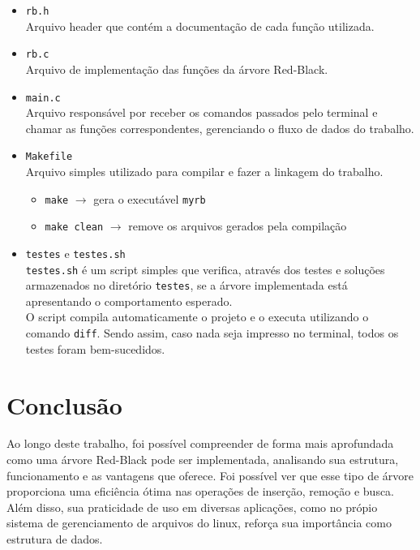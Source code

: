 \documentclass{article}  %
\begin{document}
    \begin{itemize}
        \item \texttt{rb.h} \\
        Arquivo header que contém a documentação de cada função utilizada.
        
        \item \texttt{rb.c} \\
        Arquivo de implementação das funções da árvore Red-Black.
        
        \item \texttt{main.c} \\
        Arquivo responsável por receber os comandos passados pelo terminal e chamar as funções correspondentes, gerenciando o fluxo de dados do trabalho.
        
        \item \texttt{Makefile} \\
        Arquivo simples utilizado para compilar e fazer a linkagem do trabalho.
        \begin{itemize}
            \item \texttt{make} \( \rightarrow \) gera o executável \texttt{myrb}
            \item \texttt{make clean} \( \rightarrow \) remove os arquivos gerados pela compilação
        \end{itemize}
        
        \item \texttt{testes} e \texttt{testes.sh} \\
        \texttt{testes.sh} é um script simples que verifica, através dos testes e soluções armazenados no diretório \texttt{testes}, se a árvore implementada está apresentando o comportamento esperado.\\
        O script compila automaticamente o projeto e o executa utilizando o comando \texttt{diff}. Sendo assim, caso nada seja impresso no terminal, todos os testes foram bem-sucedidos.
    \end{itemize}

        
    \section{Conclusão}

    Ao longo deste trabalho, foi possível compreender de forma mais aprofundada como uma árvore Red-Black pode ser implementada, analisando sua estrutura, funcionamento e as vantagens que oferece. Foi possível ver que esse tipo de árvore proporciona uma eficiência ótima nas operações de inserção, remoção e busca. Além disso, sua praticidade de uso em diversas aplicações, como no própio sistema de gerenciamento de arquivos do linux, reforça sua importância como estrutura de dados.
\end{document}
